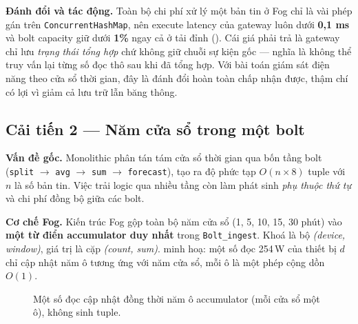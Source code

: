 \documentclass[13pt,a4paper]{report}
\newcommand{\code}[1]{\texttt{\small #1}}
\begin{document}
\textbf{Đánh đổi và tác động.} Toàn bộ chi phí xử lý một bản tin ở Fog chỉ là vài
phép gán trên \code{ConcurrentHashMap}, nên execute latency của gateway luôn dưới
\textbf{0,1 ms} và bolt capacity giữ dưới \textbf{1\%} ngay cả ở tải đỉnh
(). Cái giá phải trả là gateway chỉ lưu \textit{trạng thái tổng
hợp} chứ không giữ chuỗi sự kiện gốc --- nghĩa là không thể truy vấn lại từng số
đọc thô sau khi đã tổng hợp. Với bài toán giám sát điện năng theo cửa sổ thời
gian, đây là đánh đổi hoàn toàn chấp nhận được, thậm chí có lợi vì giảm cả lưu trữ
lẫn băng thông.

\subsection{Cải tiến 2 --- Năm cửa sổ trong một bolt}

\textbf{Vấn đề gốc.} Monolithic phân tán tám cửa sổ thời gian qua bốn tầng bolt
(\code{split} $\to$ \code{avg} $\to$ \code{sum} $\to$ \code{forecast}), tạo ra độ
phức tạp $O(n \times 8)$ tuple với $n$ là số bản tin. Việc trải logic qua nhiều
tầng còn làm phát sinh \textit{phụ thuộc thứ tự} và chi phí đồng bộ giữa các bolt.

\textbf{Cơ chế Fog.} Kiến trúc Fog gộp toàn bộ năm cửa sổ (1, 5, 10, 15, 30 phút)
vào \textbf{một từ điển accumulator duy nhất} trong \code{Bolt\_ingest}. Khoá là
bộ \textit{(device, window)}, giá trị là cặp \textit{(count, sum)}.
 minh hoạ: một số đọc 254\,W của thiết bị $d$ chỉ cập nhật năm ô
tương ứng với năm cửa sổ, mỗi ô là một phép cộng dồn $O(1)$.

\begin{figure}[H]
\centering
{}
\caption{Một số đọc cập nhật đồng thời năm ô accumulator (mỗi cửa sổ một ô), không sinh tuple.}
\label{fig:imp-acc}
\end{figure}
\end{document}
